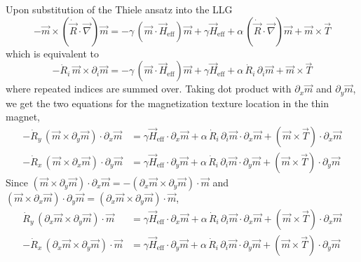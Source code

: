\documentclass[aps,prb,onecolumn,notitlepage,showpacs,floatfix,superscriptaddress]{revtex4-1}
\newcommand{\mrm}[1]{\mathrm{#1}}
\begin{document}
Upon substitution of the Thiele ansatz into the LLG
\begin{equation}
-\vec{m} \times (\dot{\vec{R}}\cdot \vec{\nabla}) \vec{m} = -\gamma \, (\vec{m} \cdot \vec{H}_\mrm{eff}) \vec{m} + \gamma \vec{H}_\mrm{eff} + \alpha \, (\dot{\vec{R}}\cdot \vec{\nabla})\vec{m} + \vec{m} \times \vec{T}
\end{equation}
which is equivalent to
\begin{equation}
-\dot{R}_i \, \vec{m} \times \partial_i \vec{m} = -\gamma \, (\vec{m} \cdot \vec{H}_\mrm{eff}) \vec{m} + \gamma \vec{H}_\mrm{eff} + \alpha \, \dot{R}_i \, \partial_i \vec{m} + \vec{m} \times \vec{T}
\end{equation}
where repeated indices are summed over. Taking dot product with $\partial_x \vec{m}$ and $\partial_y \vec{m}$, we get the two equations for the magnetization texture location in the thin magnet,
\begin{equation}
\begin{split}
-\dot{R}_y \, (\vec{m} \times \partial_y \vec{m}) \cdot \partial_x \vec{m} &= \gamma \vec{H}_\mrm{eff} \cdot \partial_x \vec{m} + \alpha \, \dot{R}_i \, \partial_i \vec{m} \cdot \partial_x \vec{m} + (\vec{m} \times \vec{T}) \cdot \partial_x \vec{m}\\
-\dot{R}_x \, (\vec{m} \times \partial_x \vec{m}) \cdot \partial_y \vec{m} &= \gamma \vec{H}_\mrm{eff} \cdot \partial_y \vec{m} + \alpha \, \dot{R}_i \, \partial_i \vec{m} \cdot \partial_y \vec{m} + (\vec{m} \times \vec{T}) \cdot \partial_y \vec{m}
\end{split}
\end{equation}
Since $(\vec{m} \times \partial_y \vec{m}) \cdot \partial_x \vec{m} = - (\partial_x \vec{m} \times \partial_y \vec{m}) \cdot  \vec{m}$ and $(\vec{m} \times \partial_x \vec{m}) \cdot \partial_y \vec{m} =  (\partial_x \vec{m} \times \partial_y \vec{m}) \cdot  \vec{m}$,
\begin{equation}
\begin{split}
\dot{R}_y \, (\partial_x \vec{m} \times \partial_y \vec{m}) \cdot  \vec{m} &= \gamma \vec{H}_\mrm{eff} \cdot \partial_x \vec{m} + \alpha \, \dot{R}_i \, \partial_i \vec{m} \cdot \partial_x \vec{m} + (\vec{m} \times \vec{T}) \cdot \partial_x \vec{m}\\
-\dot{R}_x \, (\partial_x \vec{m} \times \partial_y \vec{m}) \cdot  \vec{m} &= \gamma \vec{H}_\mrm{eff} \cdot \partial_y \vec{m} + \alpha \, \dot{R}_i \, \partial_i \vec{m} \cdot \partial_y \vec{m} + (\vec{m} \times \vec{T}) \cdot \partial_y \vec{m}
\end{split}
\end{equation}
\end{document}
